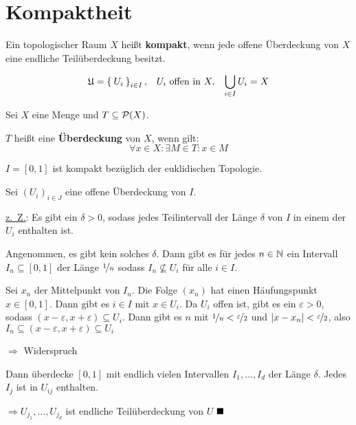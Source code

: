 \section{Kompaktheit}
\begin{definition}
    Ein topologischer Raum $X$ heißt \textbf{kompakt}, wenn jede
    offene Überdeckung von $X$ eine endliche Teilüberdeckung besitzt.

    \[\mathfrak{U} = \Set{U_i}_{i \in I},\;\;\;U_i \text{ offen in } X,\;\;\;\bigcup_{i \in I} U_i = X\]
    
\end{definition}

\begin{definition}
    Sei $X$ eine Menge und $T \subseteq \mathcal{P}(X)$.

    $T$ heißt eine \textbf{Überdeckung} von $X$, wenn gilt:
    \[\forall x \in X: \exists M \in T: x \in M\]
\end{definition}


\begin{korollar}\label{abgeschlossen01IstKompakt}
    $I = [0, 1]$ ist kompakt bezüglich der euklidischen Topologie.
\end{korollar}

\begin{beweis}
    Sei $(U_i)_{i \in J}$ eine offene Überdeckung von $I$.

\underline{z.~Z.}: Es gibt ein $\delta > 0$, sodass jedes Teilintervall
    der Länge $\delta$ von $I$ in einem der $U_i$ enthalten ist. 

Angenommen, es gibt kein solches $\delta$. Dann gibt es für jedes 
$n \in \mathbb{N}$ ein Intervall $I_n \subseteq [0,1]$ der Länge $\nicefrac{1}{n}$
sodass $I_n \not\subseteq U_i$ für alle $i \in I$.

Sei $x_n$ der Mittelpunkt von $I_n$. Die Folge $(x_n)$ hat einen 
Häufungspunkt $x \in [0,1]$. Dann gibt es $i \in I$ mit $x \in U_i$.
Da $U_i$ offen ist, gibt es ein $\varepsilon > 0$, sodass $(x - \varepsilon, x + \varepsilon) \subseteq U_i$.
Dann gibt es $n$ mit $\nicefrac{1}{n} < \nicefrac{\varepsilon}{2}$ und
$|x - x_n| < \nicefrac{\varepsilon}{2}$, also $I_n \subseteq (x - \varepsilon, x + \varepsilon) \subseteq U_i$

$\Rightarrow$ Widerspruch 

Dann überdecke $[0,1]$ mit endlich vielen Intervallen $I_1, \dots, I_d$
der Länge $\delta$. Jedes $I_j$ ist in $U_{ij}$ enthalten.

$\Rightarrow U_{j_1}, \dots, U_{j_d}$ ist endliche Teilüberdeckung von $U$
$\qed$
\end{beweis}

